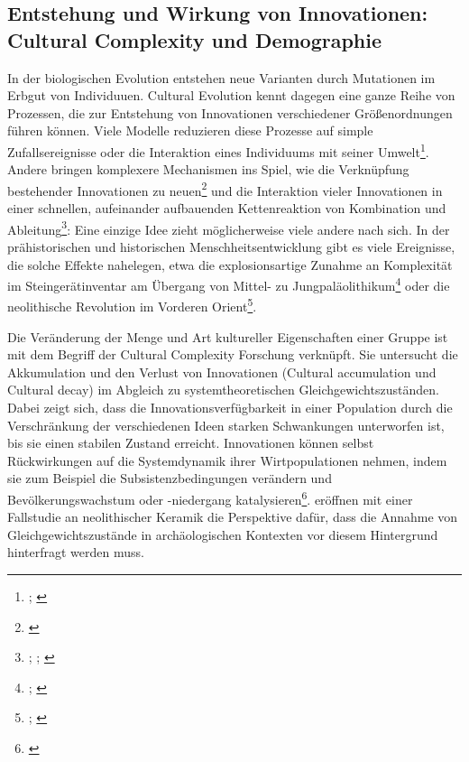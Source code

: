 \documentclass[openany,twoside,twocolumn]{book}
\let\rmarkdownfootnote\footnote%
\def\footnote{\protect\rmarkdownfootnote}
\begin{document}
\hypertarget{entstehung-und-wirkung-von-innovationen-cultural-complexity-und-demographie}{%
\subsection{Entstehung und Wirkung von Innovationen: Cultural Complexity
und
Demographie}\label{entstehung-und-wirkung-von-innovationen-cultural-complexity-und-demographie}}

In der biologischen Evolution entstehen neue Varianten durch Mutationen
im Erbgut von Individuuen. Cultural Evolution kennt dagegen eine ganze
Reihe von Prozessen, die zur Entstehung von Innovationen verschiedener
Größenordnungen führen können. Viele Modelle reduzieren diese Prozesse
auf simple Zufallsereignisse oder die Interaktion eines Individuums mit
seiner Umwelt\footnote{\textcite{henrich_evolution_2003};
  \textcite{rendell_why_2010}}. Andere bringen komplexere Mechanismen
ins Spiel, wie die Verknüpfung bestehender Innovationen zu
neuen\footnote{\textcite{enquist_why_2008}} und die Interaktion vieler
Innovationen in einer schnellen, aufeinander aufbauenden Kettenreaktion
von Kombination und Ableitung\footnote{\textcite{fogarty_cultural_2015};
  \textcite{kolodny_evolution_2015};
  \textcite{kolodny_game-changing_2016}}: Eine einzige Idee zieht
möglicherweise viele andere nach sich. In der prähistorischen und
historischen Menschheitsentwicklung gibt es viele Ereignisse, die solche
Effekte nahelegen, etwa die explosionsartige Zunahme an Komplexität im
Steingerätinventar am Übergang von Mittel- zu
Jungpaläolithikum\footnote{\textcite{bar-yosef_nature_1998};
  \textcite{roebroeks_time_2008}} oder die neolithische Revolution im
Vorderen Orient\footnote{\textcite{gopher_when_2001};
  \textcite{veen_agricultural_2010}}.

Die Veränderung der Menge und Art kultureller Eigenschaften einer Gruppe
ist mit dem Begriff der Cultural Complexity Forschung verknüpft. Sie
untersucht die Akkumulation und den Verlust von Innovationen (Cultural
accumulation und Cultural decay) im Abgleich zu systemtheoretischen
Gleichgewichtszuständen. Dabei zeigt sich, dass die
Innovationsverfügbarkeit in einer Population durch die Verschränkung der
verschiedenen Ideen starken Schwankungen unterworfen ist, bis sie einen
stabilen Zustand erreicht\autocite{kolodny_evolution_2015}. Innovationen
können selbst Rückwirkungen auf die Systemdynamik ihrer Wirtpopulationen
nehmen, indem sie zum Beispiel die Subsistenzbedingungen verändern und
Bevölkerungswachstum oder -niedergang katalysieren\footnote{\textcite{kolodny_game-changing_2016}}.
\textcite{crema_revealing_2016} eröffnen mit einer Fallstudie an
neolithischer Keramik die Perspektive dafür, dass die Annahme von
Gleichgewichtszustände in archäologischen Kontexten vor diesem
Hintergrund hinterfragt werden muss.
\end{document}
